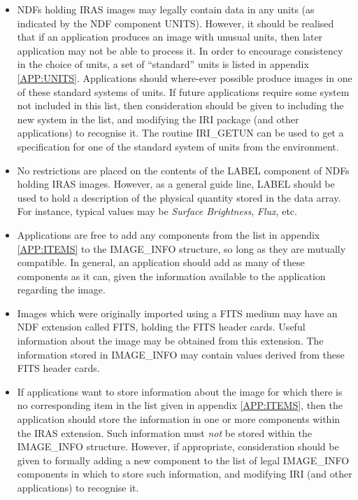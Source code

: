 \begin{itemize}

\item NDFs holding IRAS images may legally contain data in any units (as
indicated by the NDF component UNITS). However, it should be realised that if an
application produces an image with unusual units, then later application may not
be able to process it. In order to encourage consistency in the choice of units,
a set of ``standard'' units is listed in appendix \ref{APP:UNITS}. Applications
should where-ever possible produce images in one of these standard systems of
units. If future applications require some system not included in this list,
then consideration should be given to including the new system in the list, and
modifying the IRI package (and other applications) to recognise it. The routine
IRI\_GETUN can be used to get a specification for one of the standard system of
units from the environment.

\item No restrictions are placed on the contents of the LABEL component of NDFs
holding IRAS images. However, as a general guide line, LABEL should be used to
hold a description of the physical quantity stored in the data array. For
instance, typical values may be {\em Surface Brightness}, {\em Flux}, etc.

\item Applications are free to add any components from the list in appendix
\ref{APP:ITEMS} to the IMAGE\_INFO structure, so long as they are mutually
compatible. In general, an application should add as many of these components as
it can, given the information available to the application regarding the image.

\item Images which were originally imported using a FITS medium may have an NDF
extension called FITS, holding the FITS header cards. Useful information about
the image may be obtained from this extension. The information stored in
IMAGE\_INFO may contain values derived from these FITS header cards.

\item If applications want to store information about the image for which there
is no corresponding item in the list given in appendix \ref{APP:ITEMS}, then the
application should store the information in one or more components within the
IRAS extension. Such information must {\em not} be stored within the IMAGE\_INFO
structure. However, if appropriate, consideration should be given to formally
adding a new component to the list of legal IMAGE\_INFO components in which to
store such information, and modifying IRI (and other applications) to recognise
it.

\end{itemize}


